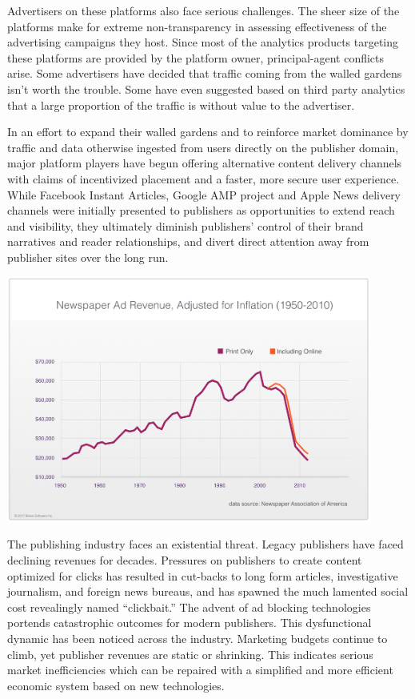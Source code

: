 \documentclass[11pt]{article}
\begin{document}
Advertisers on these platforms also face serious challenges. The sheer size of the platforms make for extreme non-transparency in assessing effectiveness of the advertising campaigns they host. Since most of the analytics products targeting these platforms are provided by the platform owner, principal-agent conflicts arise. Some advertisers have decided that traffic coming from the walled gardens isn’t worth the trouble. Some have even suggested based on third party analytics that a large proportion of the traffic is without value to the advertiser\cite{WithoutValue}.

In an effort to expand their walled gardens and to reinforce market dominance by traffic and data otherwise ingested from users directly on the publisher domain, major platform players have begun offering alternative content delivery channels with claims of incentivized placement and a faster, more secure user experience. While Facebook Instant Articles, Google AMP project and Apple News delivery channels were initially presented to publishers as opportunities to extend reach and visibility, they ultimately diminish publishers’ control of their brand narratives and reader relationships, and divert direct attention away from publisher sites over the long run.

\begin{center}
\includegraphics[width=0.9\textwidth]{newspaperadrev.png}
\end{center}

The publishing industry faces an existential threat. Legacy publishers have faced declining revenues for decades. Pressures on publishers to create content optimized for clicks has resulted in cut-backs to long form articles, investigative journalism, and foreign news bureaus, and has spawned the much lamented social cost revealingly named “clickbait.” The advent of ad blocking technologies portends catastrophic outcomes for modern publishers.
This dysfunctional dynamic has been noticed across the industry. Marketing budgets continue to climb\cite{Gartner1}, yet publisher revenues are static or shrinking\cite{Econsul}. This indicates serious market inefficiencies which can be repaired with a simplified and more efficient economic system based on new technologies.
\end{document}
